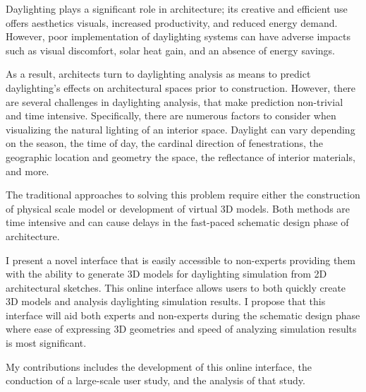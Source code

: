 Daylighting plays a significant role in architecture; its creative and efficient use offers aesthetics visuals, increased productivity, and reduced energy demand. However, poor implementation of daylighting systems can have adverse impacts such as visual discomfort, solar heat gain, and an absence of energy savings. 

As a result, architects turn to daylighting analysis as means to predict daylighting's effects on architectural spaces prior to construction. However, there are several challenges in daylighting analysis, that make prediction non-trivial and time intensive. Specifically, there are numerous factors to consider when visualizing the natural lighting of an interior space. Daylight can vary depending on the season, the time of day, the cardinal direction of fenestrations,  the geographic location and geometry the space,  the reflectance of interior materials, and more.  

The traditional approaches to solving this problem require either the construction of physical scale model or development of virtual 3D models. Both methods are time intensive and can cause delays in the fast-paced schematic design phase of architecture.  

I present a novel interface that is easily accessible to non-experts providing them with the ability to generate 3D models for daylighting simulation from 2D architectural sketches. This online interface allows users to both quickly create 3D models and analysis daylighting simulation results. I propose that this interface will aid both experts and non-experts during the schematic design phase where ease of expressing 3D geometries and speed of analyzing simulation results is most significant. 

My contributions includes the development of this online interface, the conduction of a large-scale user study, and the analysis of that study.
